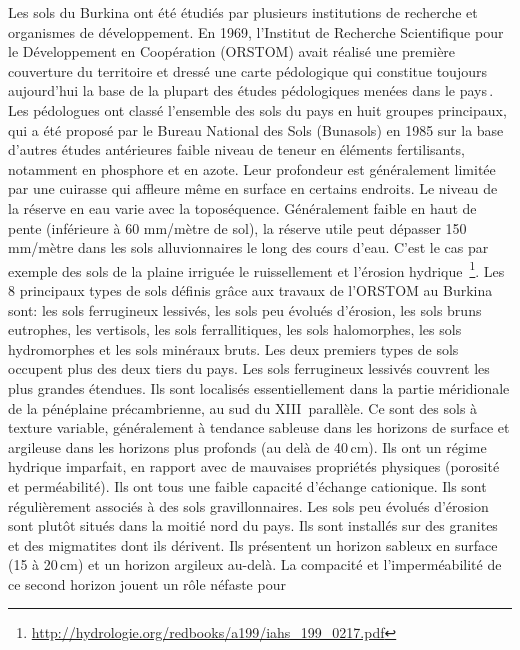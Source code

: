 \documentclass[a4paper,11pt]{article}
\begin{document}
Les sols du Burkina ont été étudiés par plusieurs institutions de
recherche et organismes de développement. En 1969, l'Institut de
Recherche Scientifique pour le Développement en Coopération (ORSTOM)
avait réalisé une première couverture du territoire et dressé une
carte pédologique qui constitue toujours aujourd'hui la base de la
plupart des études pédologiques menées dans le pays\,\cite{BUNASOLS_2008}.
Les pédologues ont classé l'ensemble des sols du pays
en huit groupes principaux, qui a été proposé par le Bureau National
des Sols (Bunasols) en 1985 sur la base d'autres études antérieures
faible niveau de teneur en éléments fertilisants, notamment en
phosphore et en azote. Leur profondeur est généralement limitée par une
cuirasse qui affleure même en surface en certains endroits. Le niveau
de la réserve en eau varie avec la toposéquence. Généralement faible
en haut de pente (inférieure à 60 mm/mètre de sol), la réserve utile
peut dépasser 150 mm/mètre dans les sols alluvionnaires le long des
cours d'eau. C'est le cas par exemple des sols de la plaine irriguée
le ruissellement et l'érosion hydrique\,\cite{Roose_2004}
\footnote{\url{http://hydrologie.org/redbooks/a199/iahs_199_0217.pdf}}. Les
8 principaux types de sols définis grâce aux travaux de l'ORSTOM au
Burkina sont: les sols ferrugineux lessivés, les sols peu évolués
d’érosion, les sols bruns eutrophes, les vertisols, les sols
ferrallitiques, les sols halomorphes, les sols hydromorphes et les
sols minéraux bruts. Les deux premiers types de sols occupent plus des
deux tiers du pays. Les sols ferrugineux lessivés couvrent les plus
grandes étendues. Ils sont localisés essentiellement dans la partie
méridionale de la pénéplaine précambrienne, au sud du XIII\ieme\,
parallèle. Ce sont des sols à texture variable, généralement à
tendance sableuse dans les horizons de surface et argileuse dans les
horizons plus profonds (au delà de 40\,cm). Ils ont un régime hydrique
imparfait, en rapport avec de mauvaises propriétés physiques (porosité
et perméabilité). Ils ont tous une faible capacité d’échange
cationique. Ils sont régulièrement associés à des sols
gravillonnaires. Les sols peu évolués d’érosion sont plutôt situés
dans la moitié nord du pays. Ils sont installés sur des granites et
des migmatites dont ils dérivent. Ils présentent un horizon sableux en
surface (15 à 20\,cm) et un horizon argileux au-delà. La compacité et
l’imperméabilité de ce second horizon jouent un rôle néfaste pour
\end{document}
